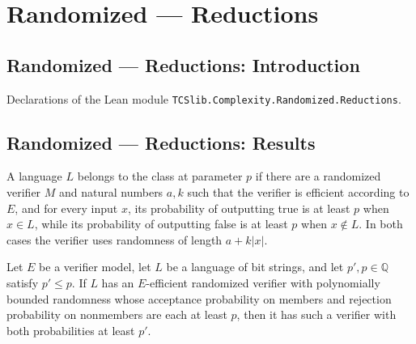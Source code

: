 \section{Randomized --- Reductions}
\subsection*{Randomized --- Reductions: Introduction}

Declarations of the Lean module \texttt{TCSlib.Complexity.Randomized.Reductions}.

\subsection*{Randomized --- Reductions: Results}

\begin{definition}
\label{Randomized.InBPPAt}
\leanok
{}
A language $L$ belongs to the class at parameter $p$ if there are a randomized verifier
$M$ and natural numbers $a,k$ such that the verifier is efficient according to $E$, and
for every input $x$, its probability of outputting true is at least $p$ when $x\in L$,
while its probability of outputting false is at least $p$ when $x\notin L$. In both
cases the verifier uses randomness of length $a+k|x|$.
\end{definition}

\begin{theorem}
\label{Randomized.InBPPAt.mono}
\leanok
{}
Let $E$ be a verifier model, let $L$ be a language of bit strings, and let
$p',p\in\mathbb{Q}$ satisfy $p'\le p$. If $L$ has an $E$-efficient randomized verifier
with polynomially bounded randomness whose acceptance probability on members and
rejection probability on nonmembers are each at least $p$, then it has such a verifier
with both probabilities at least $p'$.
\end{theorem}

